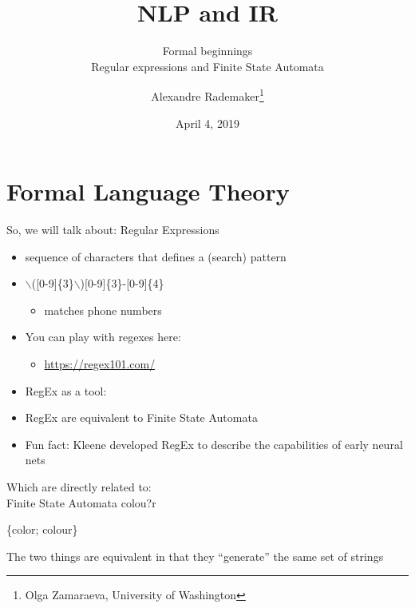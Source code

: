 \documentclass{beamer}
\title{NLP and IR}
\author[]{Alexandre Rademaker\thanks{Olga Zamaraeva, University of Washington}}
\institute{FGV/EMAp}
\subtitle{Formal beginnings\\ Regular expressions and Finite State Automata}
\date{April 4, 2019}
\def\dx{1cm} \def\dy{1.5cm}
\newcommand{\newState}[4]{\node[state,#3](#1)[#4]{#2};}
\newcommand{\newTransition}[4]{\path[->] (#1) edge [#4] node {#3} (#2);}
\begin{document}
   
\begin{frame}
  \maketitle
\end{frame}

\section{Formal Language Theory}

\begin{frame}{So, we will talk about: Regular Expressions}
  \begin{itemize}
  \item sequence of characters that defines a (search) pattern
  \item $\backslash$([0-9]\{3\}$\backslash$)[0-9]\{3\}-[0-9]\{4\}
    \begin{itemize}
    \item matches phone numbers
    \end{itemize}
  \item You can play with regexes here:
    \begin{itemize}
    \item \url{https://regex101.com/}
    \end{itemize}
  \item RegEx as a tool:
  \item RegEx are equivalent to Finite State Automata 
  \item Fun fact: Kleene developed RegEx to describe the capabilities of early neural nets
  \end{itemize}
\end{frame}

\begin{frame}{Which are directly related to: \\ Finite State Automata}
colou?r

\vspace{0.5cm}

\{color; colour\}

\vspace{0.2cm}

\begin{center}
\end{center}
The two things are equivalent in that they ``generate'' the same set of strings
\end{frame}
\end{document}
